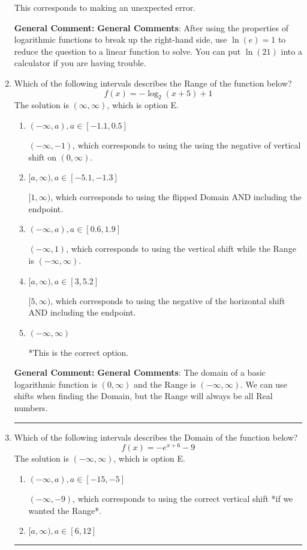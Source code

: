 \documentclass{extbook}[14pt]
\newcommand{\litem}[1]{\item #1

\rule{\textwidth}{0.4pt}}
\begin{document}
\begin{enumerate}
{\begin{enumerate}[label=\Alph*.]
This corresponds to making an unexpected error.
\end{enumerate}

\textbf{General Comment:} \textbf{General Comments}: After using the properties of logarithmic functions to break up the right-hand side, use $\ln(e) = 1$ to reduce the question to a linear function to solve. You can put $\ln(21)$ into a calculator if you are having trouble.
}
\litem{
Which of the following intervals describes the Range of the function below?
\[ f(x) = -\log_2{(x+5)}+1 \]The solution is \( (\infty, \infty) \), which is option E.\begin{enumerate}[label=\Alph*.]
\item \( (-\infty, a), a \in [-1.1, 0.5] \)

$(-\infty, -1)$, which corresponds to using the using the negative of vertical shift on $(0, \infty)$.
\item \( [a, \infty), a \in [-5.1, -1.3] \)

$[1, \infty)$, which corresponds to using the flipped Domain AND including the endpoint.
\item \( (-\infty, a), a \in [0.6, 1.9] \)

$(-\infty, 1)$, which corresponds to using the vertical shift while the Range is $(-\infty, \infty)$.
\item \( [a, \infty), a \in [3, 5.2] \)

$[5, \infty)$, which corresponds to using the negative of the horizontal shift AND including the endpoint.
\item \( (-\infty, \infty) \)

*This is the correct option.
\end{enumerate}

\textbf{General Comment:} \textbf{General Comments}: The domain of a basic logarithmic function is $(0, \infty)$ and the Range is $(-\infty, \infty)$. We can use shifts when finding the Domain, but the Range will always be all Real numbers.
}
\litem{
Which of the following intervals describes the Domain of the function below?
\[ f(x) = -e^{x+6}-9 \]The solution is \( (-\infty, \infty) \), which is option E.\begin{enumerate}[label=\Alph*.]
\item \( (-\infty, a), a \in [-15, -5] \)

$(-\infty, -9)$, which corresponds to using the correct vertical shift *if we wanted the Range*.
\item \( [a, \infty), a \in [6, 12] \)


\end{enumerate}}
\end{enumerate}
\end{document}
